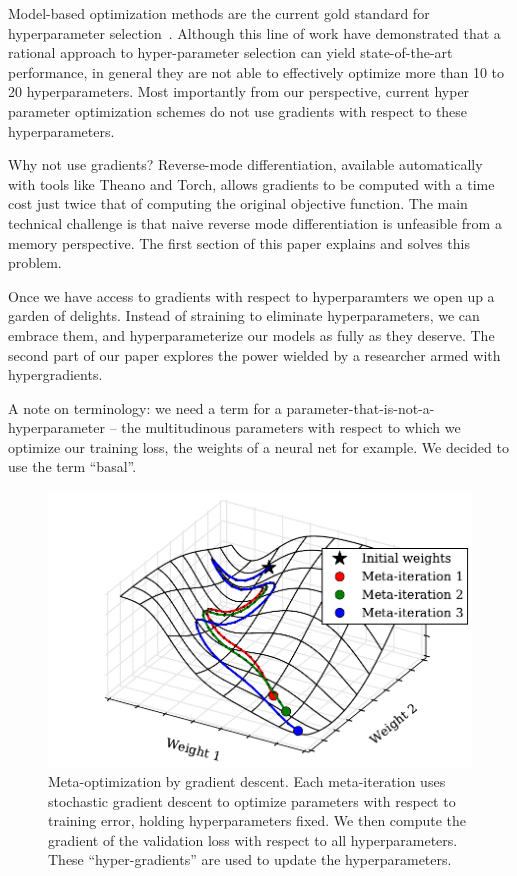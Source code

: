 \documentclass{article}
\newcommand{\primal}{basal}
\begin{document}
Model-based optimization methods are the current gold standard for
hyperparameter selection~\cite{snoek2012practical, bergstra2011algorithms,
  BerYamCox13, HutHooLey11}. Although this line of work have demonstrated that a
rational approach to hyper-parameter selection can yield state-of-the-art
performance, in general they are not able to effectively optimize more than 10
to 20 hyperparameters.  Most importantly from our perspective, current hyper
parameter optimization schemes do not use gradients with respect to these
hyperparameters.

Why not use gradients? Reverse-mode differentiation, available automatically
with tools like Theano and Torch, allows gradients to be computed with a time
cost just twice that of computing the original objective function. The main
technical challenge is that naive reverse mode differentiation is unfeasible
from a memory perspective. The first section of this paper explains and solves
this problem.

Once we have access to gradients with respect to hyperparamters we open up a
garden of delights. Instead of straining to eliminate hyperparameters, we can
embrace them, and hyperparameterize our models as fully as they deserve. The
second part of our paper explores the power wielded by a researcher armed with
hypergradients.

A note on terminology: we need a term for a
parameter-that-is-not-a-hyperparameter -- the multitudinous parameters with
respect to which we optimize our training loss, the weights of a neural net for
example. We decided to use the term ``\primal''.

\begin{figure}[t]
\vskip 0.2in
\begin{center}
\includegraphics[width=\columnwidth]{../experiments/Jan_25_Figure_1/2/learning_curves.pdf}
\caption{Meta-optimization by gradient descent.
Each meta-iteration uses stochastic gradient descent to optimize parameters with respect to training error, holding hyperparameters fixed.
We then compute the gradient of the validation loss with respect to all hyperparameters.
These ``hyper-gradients'' are used to update the hyperparameters.}
\label{fig:chaos}
\end{center}
\vskip -0.2in
\end{figure}
\end{document}
